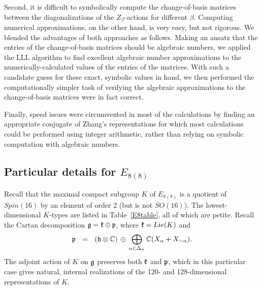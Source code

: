 \documentclass[12pt]{article}
\numberwithin{equation}{section}
\renewcommand\a{\alpha}
\newcommand{\C}{{\mathbb{C}}}
\renewcommand\({\left(}
\renewcommand\){\right)}
\begin{document}
Second, it is difficult to symbolically compute the change-of-basis matrices between the diagonalizations of the $Z_\beta$-actions for different $\beta$.  Computing numerical approximations, on the other hand, is very easy, but not rigorous.  We blended the advantages of both approaches as follows.  Making an ansatz that the entries of the change-of-basis matrices should be algebraic numbers, we applied the LLL algorithm   to find excellent algebraic number approximations to the numerically-calculated values of the entries of the matrices.  With such a candidate guess  for these exact, symbolic values in hand, we then performed the computationally simpler task of verifying the algebraic approximations to the change-of-basis matrices were in fact correct.



Finally, speed issues were circumvented in most of the calculations by finding an appropriate conjugate of Zhang's representations for which most calculations could be performed using integer arithmetic, rather than relying on symbolic computation with algebraic numbers.


\subsection{Particular details for $E_{8(8)}$}

Recall that the maximal compact subgroup $K$ of $E_{8(8)}$ is a quotient of $Spin(16)$ by an element of order 2 (but  is not $SO(16)$).  The lowest-dimensional $K$-types are listed in Table~\ref{E8table}, all of which are petite.  Recall the Cartan decomposition ${\frak g}={\frak k}\oplus {\frak p}$, where $\frak k=Lie(K)$ and
\begin{equation}\label{frakpdef}
  \frak p \ \ = \ \ (\frak h \otimes \C)\,\oplus\,\bigoplus_{\a\in\Delta_+}\C(X_\a+X_{-\a}).
\end{equation}
 The adjoint action of $K$ on $\frak g$ preserves both $\frak k$ and $\frak p$, which in this particular case gives natural, internal realizations of the 120- and 128-dimensional representations of $K$.
\end{document}
